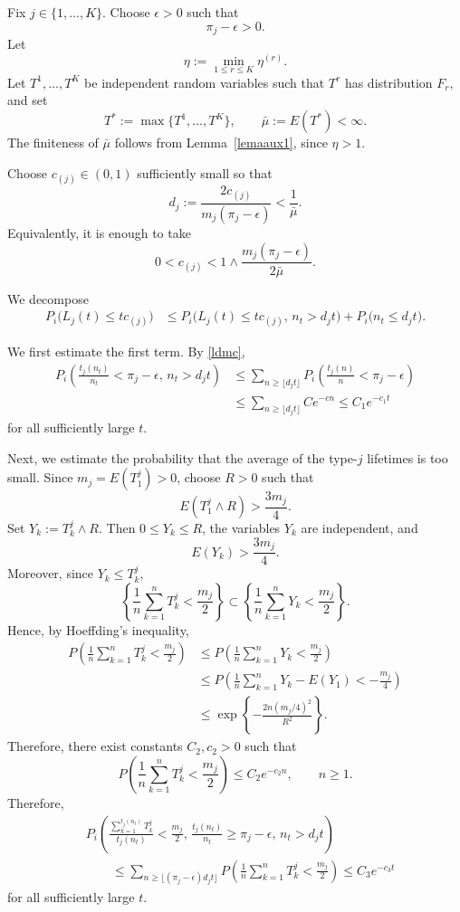 \documentclass[reqno,final,11pt]{amsart}
\newcommand{\1}{\mathbbm{1}}
\theoremstyle{plain}
\theoremstyle{definition}
\theoremstyle{remark}
\begin{document}
Fix \(j\in\{1,\dots,K\}\). Choose \(\epsilon>0\) such that
\[
\pi_j-\epsilon>0.
\]
Let
\[
\eta:=\min_{1\le r\le K}\eta^{(r)}.
\]
Let \(T^1,\ldots,T^K\) be independent random variables such that \(T^r\) has
distribution \(F_r\), and set
\[
T^*:=\max\{T^1,\dots,T^K\},
\qquad
\bar\mu:=E(T^*)<\infty.
\]
The finiteness of \(\bar\mu\) follows from Lemma~\ref{lemaaux1}, since
\(\eta>1\).

Choose \(c_{(j)}\in(0,1)\) sufficiently small so that
\[
d_j:=
\frac{2c_{(j)}}{m_j(\pi_j-\epsilon)}
<
\frac{1}{\bar\mu}.
\]
Equivalently, it is enough to take
\[
0<c_{(j)}
<
1\wedge
\frac{m_j(\pi_j-\epsilon)}{2\bar\mu}.
\]

We decompose
\[
\begin{split}
P_i\big(L_j(t)\le tc_{(j)}\big)
&\le
P_i\big(L_j(t)\le tc_{(j)},\, n_t>d_jt\big)
+
P_i\big(n_t\le d_jt\big).
\end{split}
\]

We first estimate the first term. By \eqref{ldmc},
\[
\begin{split}
P_i\left(
\frac{t_j(n_t)}{n_t}<\pi_j-\epsilon,\,
n_t>d_jt
\right)
&\le
\sum_{n\ge\lfloor d_jt\rfloor}
P_i\left(
\frac{t_j(n)}{n}<\pi_j-\epsilon
\right)
\\
&\le
\sum_{n\ge\lfloor d_jt\rfloor}Ce^{-cn}
\le
C_1e^{-c_1t}
\end{split}
\]
for all sufficiently large \(t\).

Next, we estimate the probability that the average of the type-\(j\) lifetimes is too
small. Since \(m_j=E(T_1^j)>0\), choose \(R>0\) such that
\[
E(T_1^j\wedge R)>\frac{3m_j}{4}.
\]
Set \(Y_k:=T_k^j\wedge R\). Then \(0\le Y_k\le R\), the variables
\(Y_k\) are independent, and
\[
E(Y_k)>\frac{3m_j}{4}.
\]
Moreover, since \(Y_k\le T_k^j\),
\[
\left\{
\frac1n\sum_{k=1}^nT_k^j<\frac{m_j}{2}
\right\}
\subset
\left\{
\frac1n\sum_{k=1}^nY_k<\frac{m_j}{2}
\right\}.
\]
Hence, by Hoeffding's inequality,
\[
\begin{split}
P\left(
\frac1n\sum_{k=1}^nT_k^j<\frac{m_j}{2}
\right)
&\le
P\left(
\frac1n\sum_{k=1}^nY_k<\frac{m_j}{2}
\right)\\
&\le
P\left(
\frac1n\sum_{k=1}^nY_k-E(Y_1)
<
-\frac{m_j}{4}
\right)\\
&\le
\exp\left\{
-\frac{2n(m_j/4)^2}{R^2}
\right\}.
\end{split}
\]
Therefore, there exist constants \(C_2,c_2>0\) such that
\[
P\left(
\frac1n\sum_{k=1}^nT_k^j<\frac{m_j}{2}
\right)
\le
C_2e^{-c_2n},
\qquad n\ge1.
\]
Therefore,
\[
\begin{split}
& P_i\left(
\frac{\sum_{k=1}^{t_j(n_t)}T_k^j}{t_j(n_t)}<\frac{m_j}{2},\,
\frac{t_j(n_t)}{n_t}\ge \pi_j-\epsilon,\,
n_t>d_jt
\right)
\\
&\qquad\le
\sum_{n\ge\lfloor(\pi_j-\epsilon)d_jt\rfloor}
P\left(
\frac1n\sum_{k=1}^nT_k^j<\frac{m_j}{2}
\right)
\le
C_3e^{-c_3t}
\end{split}
\]
for all sufficiently large \(t\).
\end{document}
